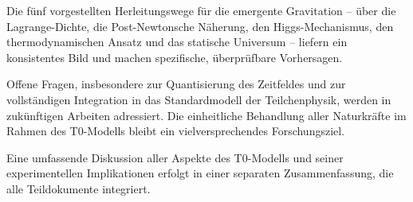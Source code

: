 \documentclass[12pt,a4paper]{article}
\begin{document}
	Die fünf vorgestellten Herleitungswege für die emergente Gravitation – über die Lagrange-Dichte, die Post-Newtonsche Näherung, den Higgs-Mechanismus, den thermodynamischen Ansatz und das statische Universum – liefern ein konsistentes Bild und machen spezifische, überprüfbare Vorhersagen.
	
	Offene Fragen, insbesondere zur Quantisierung des Zeitfeldes und zur vollständigen Integration in das Standardmodell der Teilchenphysik, werden in zukünftigen Arbeiten adressiert. Die einheitliche Behandlung aller Naturkräfte im Rahmen des T0-Modells bleibt ein vielversprechendes Forschungsziel.
	
	Eine umfassende Diskussion aller Aspekte des T0-Modells und seiner experimentellen Implikationen erfolgt in einer separaten Zusammenfassung, die alle Teildokumente integriert.
	
\end{document}
